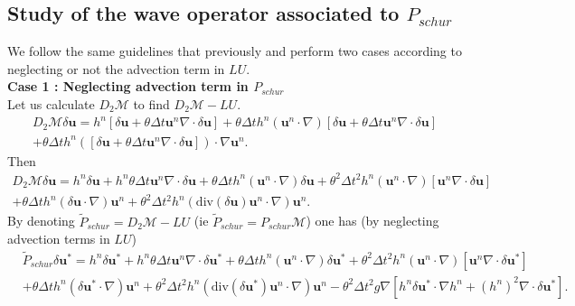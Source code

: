 \documentclass[a4paper, 11pt]{report}
\begin{document}
\subsection{Study of the wave operator associated to $P_{schur}$}
We follow the same guidelines that previously and perform two cases according to neglecting or not the advection term in $LU$.\\

\noindent\textbf{Case 1 : Neglecting advection term in $P_{schur}$}\\
Let us calculate $D_2\mathcal{M}$ to find $D_2\mathcal{M}-LU$.
\begin{equation*}
\begin{split}
D_2\mathcal{M}\delta \boldsymbol{u}=h^n\left[\delta \boldsymbol{u}+\theta\Delta t\boldsymbol{u}^n\nabla\cdot \delta \boldsymbol{u}\right]+\theta\Delta th^n\left(\boldsymbol{u}^n\cdot\nabla\right)\left[\delta \boldsymbol{u}+\theta\Delta t\boldsymbol{u}^n\nabla \cdot \delta \boldsymbol{u}\right]\\
+\theta\Delta th^n\left(\left[\delta \boldsymbol{u}+\theta\Delta t\boldsymbol{u}^n\nabla \cdot \delta \boldsymbol{u}\right]\right)\cdot \nabla \boldsymbol{u}^n.
\end{split}
\end{equation*}
Then
\begin{equation*}
\begin{split}
D_2\mathcal{M}\delta \boldsymbol{u}=h^n\delta \boldsymbol{u}+h^n\theta\Delta t\boldsymbol{u}^n\nabla \cdot \delta \boldsymbol{u}+\theta\Delta th^n\left(\boldsymbol{u}^n\cdot \nabla \right)\delta \boldsymbol{u}+\theta^2\Delta t^2h^n\left(\boldsymbol{u}^n\cdot \nabla \right)\left[\boldsymbol{u}^n\nabla \cdot \delta \boldsymbol{u}\right]\\+\theta\Delta th^n\left(\delta \boldsymbol{u}\cdot \nabla \right)\boldsymbol{u}^n+\theta^2\Delta t^2h^n\left(\text{div}(\delta \boldsymbol{u})\boldsymbol{u}^n\cdot \nabla \right)\boldsymbol{u}^n.
\end{split}
\end{equation*}
By denoting $\tilde{P}_{schur}=D_2\mathcal{M}-LU$ (ie $\tilde{P}_{schur}=P_{schur}\mathcal{M}$) one has (by neglecting advection terms in $LU$)
\begin{equation*}
\begin{split}
&\tilde{P}_{schur}\delta \boldsymbol{u}^*=h^n\delta \boldsymbol{u}^*+h^n\theta\Delta t\boldsymbol{u}^n\nabla \cdot \delta \boldsymbol{u}^*+\theta\Delta th^n\left(\boldsymbol{u}^n\cdot \nabla \right)\delta \boldsymbol{u}^*+\theta^2\Delta t^2h^n\left(\boldsymbol{u}^n\cdot \nabla\right)\left[\boldsymbol{u}^n\nabla \cdot \delta \boldsymbol{u}^*\right]\\
&+\theta\Delta th^n\left(\delta \boldsymbol{u}^*\cdot \nabla\right)\boldsymbol{u}^n+\theta^2\Delta t^2h^n\left(\text{div}(\delta \boldsymbol{u}^*)\boldsymbol{u}^n\cdot \nabla\right)\boldsymbol{u}^n-\theta^2\Delta t^2g\nabla\left[h^n\delta \boldsymbol{u}^*\cdot \nabla h^n+(h^n)^2\nabla \cdot \delta \boldsymbol{u}^*\right].
\end{split}
\end{equation*}
\end{document}

